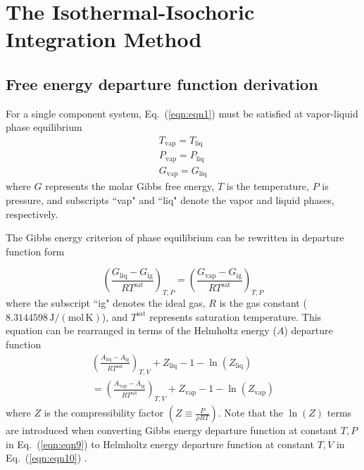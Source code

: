 \documentclass[5p,times]{elsarticle}
\begin{document}
\section{The Isothermal-Isochoric Integration Method} \label{sec:ITIC-method}
\subsection{Free energy departure function derivation}
For a single component system, Eq.~(\ref{eqn:eqn1}) must be satisfied at vapor-liquid phase equilibrium
\begin{equation}
\begin{array}{l}
{T_\mathrm{vap} =T_\mathrm{liq} }\\
{P_\mathrm{vap} =P_\mathrm{liq} }\\
{G_\mathrm{vap} =G_\mathrm{liq} }
\end{array} 
\label{eqn:eqn1}
\end{equation}
where $G$ represents the molar Gibbs free energy, $T$ is the temperature, $P$ is pressure, and subscripts ``vap" and ``liq" denote the vapor and liquid phases, respectively. 

The Gibbs energy criterion of phase equilibrium can be rewritten in departure function form

\begin{equation}
\left(\frac{G_\mathrm{liq} -G_\mathrm{ig} }{RT^\mathrm{sat}}\right)_{T,P} =\left(\frac{G_\mathrm{vap}-G_\mathrm{ig}}{RT^\mathrm{sat}}\right)_{T,P} \label{eqn:eqn9}
\end{equation}
where the subscript ``ig" denotes the ideal gas, $R$ is the gas constant ($8.3144598\,\mathrm{J/(mol\,K)}$), and $T^\mathrm{sat}$ represents saturation temperature. This equation can be rearranged in terms of the Helmholtz energy ($A$) departure function 
\begin{equation}
\begin{array}{l}
{\left(\frac{A_\mathrm{liq} -A_\mathrm{ig} }{RT^\mathrm{sat}} \right)_{T,V} +Z_{\mathrm{liq}} -1-\ln(Z_{\mathrm{liq}})} 
\\ 
{=\left(\frac{A_\mathrm{vap} -A_\mathrm{ig} }{RT^\mathrm{sat}} \right)_{T,V} +Z_{\mathrm{vap}} -1-\ln(Z_{\mathrm{vap}})}  
\end{array} 
\label{eqn:eqn10}
\end{equation}
where $Z$ is the compressibility factor $(Z \equiv \frac{P}{\rho RT})$. Note that the $\ln(Z)$ terms are introduced when converting Gibbs energy departure function at constant $T,P$ in Eq.~(\ref{eqn:eqn9}) to Helmholtz energy departure function at constant $T,V$ in Eq.~(\ref{eqn:eqn10}) \cite{Elliott1999}. 
\end{document}
